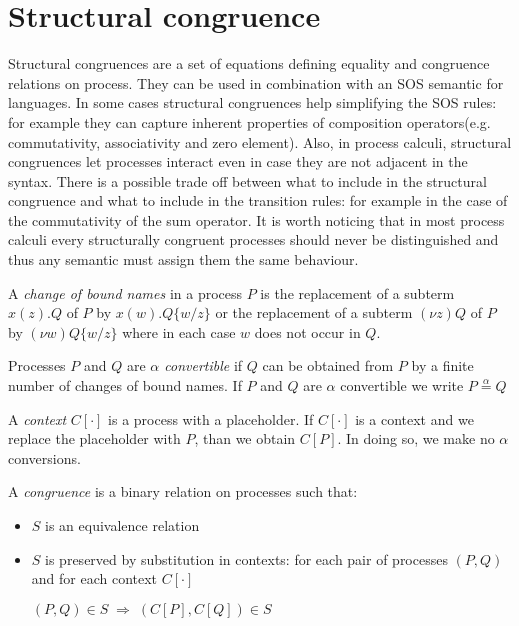 \section{Structural congruence}

Structural congruences are a set of equations defining equality and congruence relations on process. They can be used in combination with an SOS semantic for languages. In some cases structural congruences help simplifying the SOS rules: for example they can capture inherent properties of composition operators(e.g. commutativity, associativity and zero element). Also, in process calculi, structural congruences let processes interact even in case they are not adjacent in the syntax. There is a possible trade off between what to include in the structural congruence and what to include in the transition rules: for example in the case of the commutativity of the sum operator. It is worth noticing that in most process calculi every structurally congruent processes should never be distinguished and thus any semantic must assign them the same behaviour.

\begin{definition}
  A \emph{change of bound names} in a process $P$ is the replacement of a subterm $x(z).Q$ of $P$ by $x(w).Q\{w/z\}$ or the replacement of a subterm $(\nu z)Q$ of $P$ by $(\nu w)Q\{w/z\}$ where in each case $w$ does not occur in $Q$.
\end{definition}

\begin{definition}
  Processes $P$ and $Q$ are \emph{$\alpha$ convertible} if $Q$ can be obtained from $P$ by a finite number of changes of bound names. If $P$ and $Q$ are $\alpha$ convertible we write $P\stackrel{\alpha}{=}Q$
\end{definition}


\begin{definition}
  A \emph{context} $C[\cdot]$ is a process with a placeholder. If $C[\cdot]$ is a context and we replace the placeholder with $P$, than we obtain $C[P]$. In doing so, we make no $\alpha$ conversions.
\end{definition}


\begin{definition}
  A \emph{congruence} is a binary relation on processes such that:
  \begin{itemize}
    \item 
      $S$ is an equivalence relation
    \item 
      $S$ is preserved by substitution in contexts: for each pair of processes $(P, Q)$ and for each context $C[\cdot]$
      \begin{center}
	$(P,Q)\in S\; \Rightarrow\; (C[P], C[Q])\in S$
      \end{center}
  \end{itemize}
\end{definition}


